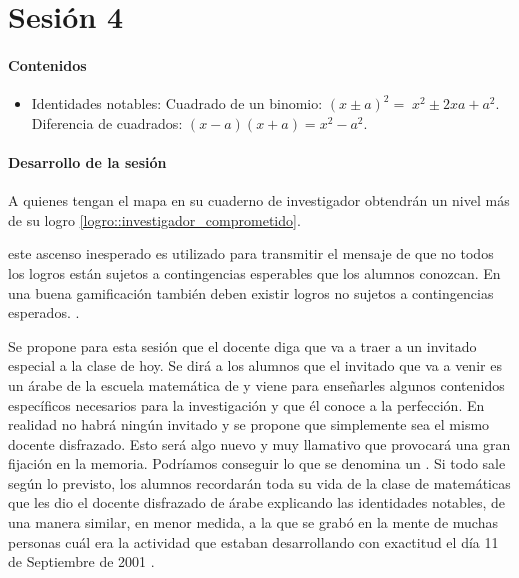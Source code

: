 
\section{Sesión 4}


\paragraph{Contenidos}
\begin{itemize}
	\item Identidades notables: 
	\subitem Cuadrado de un binomio: $(x\pm a)^2 = \;x^2\pm 2xa + a^2$.
	\subitem Diferencia de cuadrados: $(x-a)(x+a) = x^2-a^2$.
\end{itemize}

\paragraph{Desarrollo de la sesión}

A quienes tengan el mapa en su cuaderno de investigador obtendrán un nivel más de su logro \ref{logro::investigador_comprometido}.

\Justificacion{} este ascenso inesperado es utilizado para transmitir el mensaje de que no todos los logros están sujetos a contingencias esperables que los alumnos conozcan.
%
En una buena gamificación también deben existir logros no sujetos a contingencias esperados. \citep{werbach2012win}.

Se propone para esta sesión que el docente diga que va a traer a un invitado especial a la clase de hoy.
%
Se dirá a los alumnos que el invitado que va a venir es un árabe de la escuela matemática de \arab y viene para enseñarles algunos contenidos específicos necesarios para la investigación y que él conoce a la perfección.
%
En realidad no habrá ningún invitado y se propone que simplemente sea el mismo docente disfrazado.
%
Esto será algo nuevo y muy llamativo que provocará una gran fijación en la memoria.
%
Podríamos conseguir lo que se denomina un .
Si todo sale según lo previsto, los alumnos recordarán toda su vida de la clase de matemáticas que les dio el docente disfrazado de árabe explicando las identidades notables, 
%
de una manera similar, en menor medida, a la que se grabó en la mente de muchas personas cuál era la actividad que estaban desarrollando con exactitud el día 11 de Septiembre de 2001 \citep{11s}.

